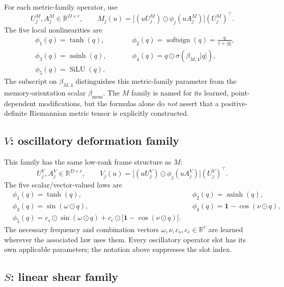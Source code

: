 \documentclass[11pt,a4paper]{article}
\newcommand{\R}{\mathbb{R}}
\newcommand{\SiLU}{\operatorname{SiLU}}
\newcommand{\one}{\mathbf{1}}
\newcommand{\T}{\top}
\begin{document}
For each metric-family operator, use
\begin{equation}
U_j^M,A_j^M\in\R^{D\times r},\qquad
\boxed{M_j(u)=\bigl[(uU_j^M)\odot\phi_j(uA_j^M)\bigr](U_j^M)^{\T}.}
\end{equation}
The five local nonlinearities are
\begin{equation}
\begin{aligned}
&\phi_1(q)=\tanh(q),\qquad &&\phi_2(q)=\operatorname{softsign}(q)=\frac{q}{1+|q|},\\
&\phi_3(q)=\operatorname{asinh}(q),\qquad &&\phi_4(q)=q\odot\sigma(\beta_{M,4}|q|),\\
&\phi_5(q)=\SiLU(q).
\end{aligned}
\end{equation}
The subscript on $\beta_{M,4}$ distinguishes this metric-family parameter from the memory-orientation
scalar $\beta_{\mathrm{mem}}$. The $M$ family is named for its
learned, point-dependent modifications, but the formulas alone do \emph{not} assert that a
positive-definite Riemannian metric tensor is explicitly constructed.

\subsection{$V$: oscillatory deformation family}

This family has the same low-rank frame structure as $M$:
\begin{equation}
U_j^V,A_j^V\in\R^{D\times r},\qquad
\boxed{V_j(u)=\bigl[(uU_j^V)\odot\phi_j(uA_j^V)\bigr](U_j^V)^{\T}.}
\end{equation}
The five scalar/vector-valued laws are
\begin{equation}
\begin{aligned}
&\phi_1(q)=\tanh(q), &&\phi_2(q)=\operatorname{asinh}(q),\\
&\phi_3(q)=\sin(\omega\odot q), &&\phi_4(q)=\one-\cos(\nu\odot q),\\
&\phi_5(q)=c_s\odot\sin(\omega\odot q)+c_c\odot\bigl[\one-\cos(\nu\odot q)\bigr].
\end{aligned}
\end{equation}
The necessary frequency and combination vectors $\omega,\nu,c_s,c_c\in\R^{r}$ are learned wherever the
associated law uses them. Every oscillatory operator slot has its own applicable parameters; the notation
above suppresses the slot index.

\subsection{$S$: linear shear family}
\end{document}
